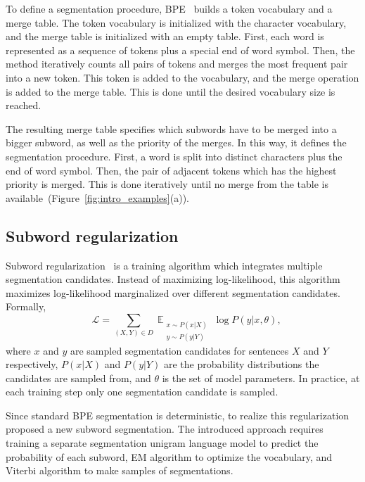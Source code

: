 \documentclass[11pt,a4paper]{article}
\begin{document}
To define a segmentation procedure, BPE~\cite{sennrich-etal-2016-neural} builds a token vocabulary and a merge table.
The token vocabulary is initialized with the character vocabulary, and the merge table is initialized with an empty table. First, each word is represented as a sequence of tokens plus a special end of word symbol. Then, the method iteratively counts all pairs of tokens and merges the most frequent pair into a new token. This token is added to the vocabulary, and the merge operation is added to the merge table. This is done until the desired vocabulary size is reached. 

The resulting merge table specifies which subwords have to be merged into a bigger subword, as well as the priority of the merges. In this way, it defines the segmentation procedure. First, a word is split into distinct characters plus the end of word symbol. Then, the pair of adjacent tokens which has the highest priority is merged. This is done iteratively until no merge from the table is available~(Figure~\ref{fig:intro_examples}(a)).

\subsection{Subword regularization}\label{sec:subword_reg}

Subword regularization~\cite{sentencepiece} is a training algorithm which integrates multiple segmentation candidates. Instead of maximizing log-likelihood, this algorithm maximizes log-likelihood marginalized over different segmentation candidates. Formally,
\vspace{-2ex}
\begin{equation} \label{eq:objective}
\begin{split}
\end{split}
\mathcal{L} = \sum_{(X,Y)\in D}{\mathop{\mathbb{E}}_{\substack{x \sim P(x | X) \\ y \sim P(y | Y)}} {\log P (y | x, \theta)}},
\end{equation}
where $ x $ and $ y $ are sampled segmentation candidates for sentences $ X $ and $ Y $ respectively, $P(x|X)$ and $P(y|Y)$ are the probability distributions the candidates are sampled from, and $ \theta $ is the set of model parameters. In practice, at each training step only one segmentation candidate is sampled.

Since standard BPE segmentation is deterministic, to realize this regularization~\citet{sentencepiece} proposed a new subword segmentation. The introduced approach requires training a separate segmentation unigram language model to predict the probability of each subword, EM algorithm to optimize the vocabulary, and Viterbi algorithm to make samples of segmentations.
\end{document}
